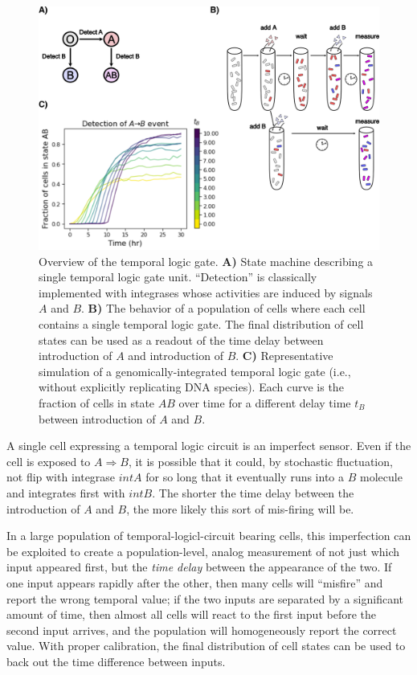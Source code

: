 \documentclass[preprint,12pt]{oldplainarticle}
\begin{document}
\begin{figure}[!ht]
\centering
\includegraphics[scale=1]{figures/TLG_overview.png}
\caption{Overview of the temporal logic gate. \textbf{A)} State machine describing a single temporal logic gate unit. ``Detection'' is classically implemented with integrases whose activities are induced by signals $A$ and $B$. \textbf{B)} The behavior of a population of cells where each cell contains a single temporal logic gate. The final distribution of cell states can be used as a readout of the time delay between introduction of $A$ and introduction of $B$. \textbf{C)} Representative simulation of a genomically-integrated temporal logic gate (i.e., without explicitly replicating DNA species). Each curve is the fraction of cells in state $AB$ over time for a different delay time $t_B$ between introduction of $A$ and $B$.}
\label{fig:tlg_overview}
\end{figure}

A single cell expressing a temporal logic circuit is an imperfect sensor. Even if the cell is exposed to $A \Rightarrow B$, it is possible that it could, by stochastic fluctuation, not flip with integrase $intA$ for so long that it eventually runs into a $B$ molecule and integrates first with $intB$. The shorter the time delay between the introduction of $A$ and $B$, the more likely this sort of mis-firing will be. 

In a large population of temporal-logicl-circuit bearing cells, this imperfection can be exploited to create a population-level, analog measurement of not just which input appeared first, but the \emph{time delay} between the appearance of the two. If one input appears rapidly after the other, then many cells will ``misfire'' and report the wrong temporal value; if the two inputs are separated by a significant amount of time, then almost all cells will react to the first input before the second input arrives, and the population will homogeneously report the correct value. With proper calibration, the final distribution of cell states can be used to back out the time difference between inputs. 
\end{document}
